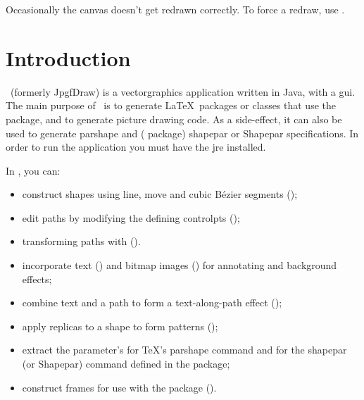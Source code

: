 Occasionally the canvas doesn't get redrawn correctly. To force a
redraw, use .

\frontmatter
\tableofcontents

\mainmatter
\chapter{Introduction}
\label{sec:introduction}

\FlowframTk\ (formerly \gls{JpgfDraw})
is a \gls{vectorgraphics} application written in \gls{Java}, with a 
\gls{gui}.  The main purpose of \FlowframTk\ is to generate \LaTeX\ packages or 
classes that use the  package, and to generate
 picture drawing code. As a side-effect, it can also be
used to generate \gls{parshape} and ( package) \gls{shapepar} or 
\gls{Shapepar} specifications. In order to run the application you 
must have the \gls{jre} installed.

In \FlowframTk, you can:

\begin{itemize}
  \item construct shapes using line, move and cubic Bézier segments
();

  \item edit paths by modifying the defining \glspl{controlpt}
  ();

  \item transforming paths with  ().

  \item incorporate text () and 
  bitmap images ()
  for annotating and background effects;

  \item combine text and a path to form a text-along-path
  effect ();

  \item apply replicas to a shape to form patterns
  ();

  \item extract the parameter's for \TeX's \gls{parshape} command and for 
  the \gls{shapepar} (or \gls{Shapepar}) command defined in the
   package;

  \item construct frames for use with the  package
  ().
\end{itemize}

